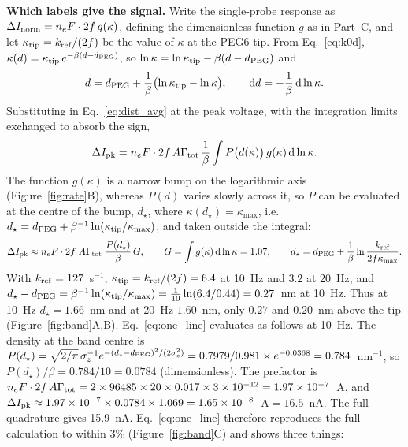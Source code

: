 \documentclass[10pt,a4paper]{article}
\numberwithin{equation}{section}
\newcommand{\DI}{\Delta I}
\newcommand{\Grtot}{\Gamma_{\rm tot}}
\newcommand{\kref}{k_{\rm ref}}
\newcommand{\figref}[1]{Figure~\ref{#1}}
\newcommand{\Gint}{1.07}
\newcommand{\approxErrTen}{3}
\newcommand{\dStarTen}{1.66}
\newcommand{\dStarTenOff}{0.27}
\newcommand{\dStarTwenty}{1.60}
\newcommand{\dStarTwentyOff}{0.20}
\newcommand{\kRef}{127}
\newcommand{\kappaMax}{0.44}
\newcommand{\kappaTenHz}{6.4}
\newcommand{\kappaTwentyHz}{3.2}
\newcommand{\peakNA}{15.9}
\begin{document}
\textbf{Which labels give the signal.} Write the single-probe response as
$\DI_{\rm norm}=n_eF\cdot2f\,g(\kappa)$, defining the dimensionless function $g$ as in Part~C, and let
$\kappa_{\rm tip}=\kref/(2f)$ be the value of $\kappa$ at the PEG6 tip. From Eq.~\eqref{eq:k0d},
$\kappa(d)=\kappa_{\rm tip}\,e^{-\beta(d-d_{\rm PEG})}$, so
$\ln\kappa=\ln\kappa_{\rm tip}-\beta(d-d_{\rm PEG})$ and
\[
  d=d_{\rm PEG}+\frac{1}{\beta}\bigl(\ln\kappa_{\rm tip}-\ln\kappa\bigr),\qquad
  {\rm d}d=-\frac{1}{\beta}\,{\rm d}\ln\kappa .
\]
Substituting in Eq.~\eqref{eq:dist_avg} at the peak voltage, with the integration limits exchanged to absorb the sign,
\[
  \DI_{\rm pk}=n_eF\cdot2f\,A\Grtot\,\frac{1}{\beta}\int P\bigl(d(\kappa)\bigr)\,g(\kappa)\,{\rm d}\ln\kappa .
\]
The function $g(\kappa)$ is a narrow bump on the logarithmic axis (\figref{fig:rate}B), whereas $P(d)$ varies
slowly across it, so $P$ can be evaluated at the centre of the bump, $d_\star$, where $\kappa(d_\star)=\kappa_{\max}$, i.e.\
$d_\star=d_{\rm PEG}+\beta^{-1}\ln(\kappa_{\rm tip}/\kappa_{\max})$, and taken outside the integral:
\begin{equation}
  \DI_{\rm pk}\approx n_eF\cdot2f\;A\Grtot\;\frac{P(d_\star)}{\beta}\,G,\qquad
  G=\int g(\kappa)\,{\rm d}\ln\kappa=\Gint,\qquad
  d_\star=d_{\rm PEG}+\frac{1}{\beta}\ln\frac{\kref}{2f\kappa_{\max}}.
  \label{eq:one_line}
\end{equation}
With $\kref=\kRef$~s$^{-1}$, $\kappa_{\rm tip}=\kref/(2f)=\kappaTenHz$ at 10~Hz and $\kappaTwentyHz$ at 20~Hz, and
$d_\star-d_{\rm PEG}=\beta^{-1}\ln(\kappa_{\rm tip}/\kappa_{\max})=\frac{1}{10}\ln(\kappaTenHz/\kappaMax)=\dStarTenOff$~nm at 10~Hz. Thus
at 10~Hz $d_\star=\dStarTen$~nm and at 20~Hz $\dStarTwenty$~nm, only $\dStarTenOff$ and $\dStarTwentyOff$~nm above the
tip (\figref{fig:band}A,B). Eq.~\eqref{eq:one_line} evaluates as follows at 10~Hz. The density at the band centre is
$P(d_\star)=\sqrt{2/\pi}\,\sigma_z^{-1}e^{-(d_\star-d_{\rm PEG})^2/(2\sigma_z^2)}=0.7979/0.981\times e^{-0.0368}=0.784$~nm$^{-1}$,
so $P(d_\star)/\beta=0.784/10=0.0784$ (dimensionless). The prefactor is
$n_eF\cdot2f\,A\Grtot=2\times96485\times20\times0.017\times3\times10^{-12}=1.97\times10^{-7}$~A, and
$\DI_{\rm pk}\approx1.97\times10^{-7}\times0.0784\times1.069=1.65\times10^{-8}$~A$=16.5$~nA. The full quadrature gives \peakNA~nA.
Eq.~\eqref{eq:one_line} therefore reproduces the full calculation to within
\approxErrTen\% (\figref{fig:band}C) and shows three things:
\end{document}
